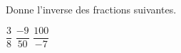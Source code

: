 %
%
Donne l'inverse des fractions suivantes.
  \begin{tasks}
    \task $\dfrac{3}{8}$
    \task $\dfrac{- 9}{50}$
    \task $\dfrac{100}{- 7}$
  \end{tasks}
